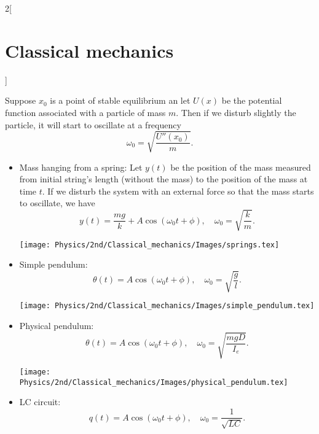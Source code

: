 \documentclass[../../../main.tex]{subfiles}
\begin{document}
\begin{multicols}{2}[\section{Classical mechanics}]
\begin{definition}
    \end{definition}
    \begin{prop}
        Suppose $x_0$ is a point of stable equilibrium an let $U(x)$ be the potential function associated with a particle of mass $m$. Then if we disturb slightly the particle, it will start to oscillate at a frequency $$\omega_0=\sqrt{\frac{U''(x_0)}{m}}.$$
    \end{prop}
    \begin{prop}[Examples]
        \hfill
        \begin{itemize}
            \item Mass hanging from a spring: Let $y(t)$ be the position of the mass measured from initial string's length (without the mass) to the position of the mass at time $t$. If we disturb the system with an external force so that the mass starts to oscillate, we have $$y(t)=\frac{mg}{k}+A\cos(\omega_0t+\phi),\quad\omega_0=\sqrt{\frac{k}{m}}.$$
                  \begin{minipage}{\linewidth}
                      \centering
                      \texttt{[image: Physics/2nd/Classical\_mechanics/Images/springs.tex]}
                  \end{minipage}
            \item Simple pendulum: $$\theta(t)=A\cos(\omega_0t+\phi),\quad\omega_0=\sqrt{\frac{g}{l}}.$$
                  \begin{minipage}{\linewidth}
                      \centering
                      \texttt{[image: Physics/2nd/Classical\_mechanics/Images/simple\_pendulum.tex]}
                  \end{minipage}
            \item Physical pendulum:
                  $$\theta(t)=A\cos(\omega_0t+\phi),\quad\omega_0=\sqrt{\frac{mgD}{I_e}}.$$
                  \begin{minipage}{\linewidth}
                      \centering
                      \texttt{[image: Physics/2nd/Classical\_mechanics/Images/physical\_pendulum.tex]}
                  \end{minipage}
            \item LC circuit: $$q(t)=A\cos(\omega_0t+\phi),\quad\omega_0=\frac{1}{\sqrt{LC}}.$$
        \end{itemize}
    \end{prop}

\end{multicols}
\end{document}

